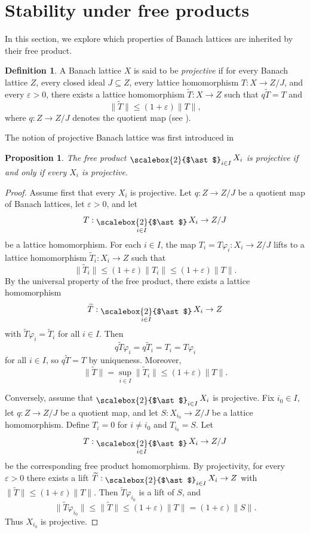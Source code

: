 \documentclass[12pt]{amsart}
\DeclareMathOperator*{\bigfree}{\raisebox{-0.6ex}{\scalebox{2}{$\ast$}}}
\theoremstyle{plain}
\newtheorem{proposition}[theorem]{Proposition}
\theoremstyle{definition}
\newtheorem{definition}[theorem]{Definition}
\begin{document}
\section{Stability under free products}\label{sec:stability}

In this section, we explore which properties of Banach lattices are inherited by their free product. 


\begin{definition}
A Banach lattice $X$ is said to be \emph{projective} if for every Banach lattice $Z$, every closed ideal $J\subseteq Z$, every lattice homomorphism $T:X\to Z/J$, and every $\varepsilon>0$, there exists a lattice homomorphism $\widetilde{T}:X\to Z$ such that $q\widetilde{T}=T$ and
\[
\|\widetilde{T}\|\leq (1+\varepsilon)\|T\|,
\]
where $q:Z\to Z/J$ denotes the quotient map (see \cite{projfree}).
\end{definition}
The notion of projective Banach lattice was first introduced in \cite{freebanlatlatproj} 

\begin{proposition}\label{prop:projective}
The free product $\bigfree_{i\in I}X_i$ is projective if and only if every $X_i$ is projective.
\end{proposition}

\begin{proof}
Assume first that every $X_i$ is projective. Let $q:Z\to Z/J$ be a quotient map of Banach lattices, let $\varepsilon>0$, and let
\[
T:\bigfree_{i\in I}X_i\to Z/J
\]
be a lattice homomorphism. For each $i\in I$, the map $T_i=T\varphi_i:X_i\to Z/J$ lifts to a lattice homomorphism $\widetilde{T}_i:X_i\to Z$ such that
\[
\|\widetilde{T}_i\|\leq (1+\varepsilon)\|T_i\|\leq (1+\varepsilon)\|T\|.
\]
By the universal property of the free product, there exists a lattice homomorphism
\[
\widetilde{T}:\bigfree_{i\in I}X_i\to Z
\]
with $\widetilde{T}\varphi_i=\widetilde{T}_i$ for all $i\in I$. Then
\[
q\widetilde{T}\varphi_i=q\widetilde{T}_i=T_i=T\varphi_i
\]
for all $i\in I$, so $q\widetilde{T}=T$ by uniqueness. Moreover,
\[
\|\widetilde{T}\|=\sup_{i\in I}\|\widetilde{T}_i\|
\leq (1+\varepsilon)\|T\|.
\]

Conversely, assume that $\bigfree_{i\in I}X_i$ is projective. Fix $i_0\in I$, let $q:Z\to Z/J$ be a quotient map, and let $S:X_{i_0}\to Z/J$ be a lattice homomorphism. Define $T_i=0$ for $i\neq i_0$ and $T_{i_0}=S$. Let
\[
T:\bigfree_{i\in I}X_i\to Z/J
\]
be the corresponding free product homomorphism. By projectivity, for every $\varepsilon>0$ there exists a lift $\widetilde{T}:\bigfree_{i\in I}X_i\to Z$ with $\|\widetilde{T}\|\leq (1+\varepsilon)\|T\|$. Then $\widetilde{T}\varphi_{i_0}$ is a lift of $S$, and
\[
\|\widetilde{T}\varphi_{i_0}\|\leq \|\widetilde{T}\|\leq (1+\varepsilon)\|T\|=(1+\varepsilon)\|S\|.
\]
Thus $X_{i_0}$ is projective.
\end{proof}
\end{document}
